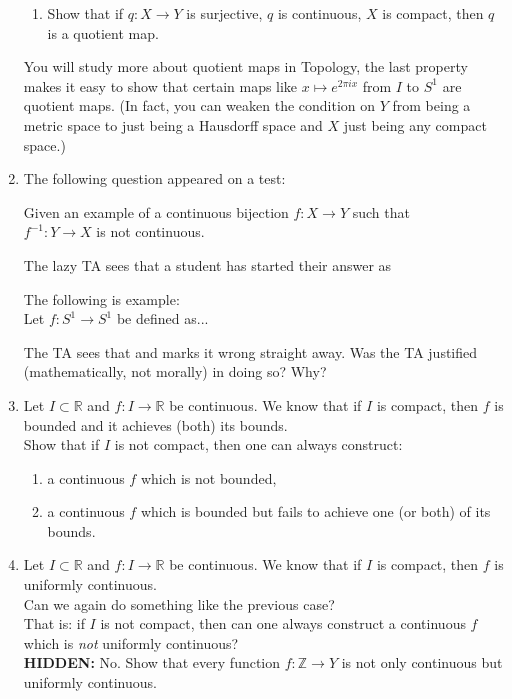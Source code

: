 \documentclass[12pt]{article}
\theoremstyle{definition}
\numberwithin{thm}{section}
\newcommand{\hint}[1]{\textbf{HIDDEN:} {\color[rgb]{0.95, 0.95, 0.95}#1}}
\newenvironment{blockquote}
{\begin{mdframed}[skipabove=0pt, skipbelow=0pt, innertopmargin=4pt, innerbottommargin=4pt, bottomline=false,topline=false,rightline=false, linewidth=2pt]}
{\end{mdframed}}
\begin{document}
\begin{enumerate}
\begin{enumerate}
		\item Show that if $q:X \to Y$ is surjective, $q$ is continuous, $X$ is compact, then $q$ is a quotient map.
	\end{enumerate}
	You will study more about quotient maps in Topology, the last property makes it easy to show that certain maps like $x \mapsto e^{2\pi ix}$ from $I$ to $S^1$ are quotient maps. (In fact, you can weaken the condition on $Y$ from being a metric space to just being a Hausdorff space and $X$ just being any compact space.)
	\item The following question appeared on a test:\\
	\begin{blockquote}
		Given an example of a continuous bijection $f:X \to Y$ such that \\
		$f^{-1}:Y \to X$ is not continuous. 
	\end{blockquote}
	The lazy TA sees that a student has started their answer as\\
	\begin{blockquote}
		The following is example:\\
		Let $f:S^1 \to S^1$ be defined as...
	\end{blockquote}
	The TA sees that and marks it wrong straight away. Was the TA justified (mathematically, not morally) in doing so? Why?
	\item Let $I \subset \mathbb{R}$ and $f:I \to \mathbb{R}$ be continuous. We know that if $I$ is compact, then $f$ is bounded and it achieves (both) its bounds.\\
	Show that if $I$ is not compact, then one can always construct:
	\begin{enumerate}
		\item a continuous $f$ which is not bounded,
		\item a continuous $f$ which is bounded but fails to achieve one (or both) of its bounds.
	\end{enumerate}
	\item Let $I \subset \mathbb{R}$ and $f:I \to \mathbb{R}$ be continuous. We know that if $I$ is compact, then $f$ is uniformly continuous.\\
	Can we again do something like the previous case?\\
	That is: if $I$ is not compact, then can one always construct a continuous $f$ which is \emph{not} uniformly continuous?\\
	\hint{No. Show that every function $f:\mathbb{Z} \to Y$ is not only continuous but uniformly continuous.}

\end{enumerate}
\end{document}
